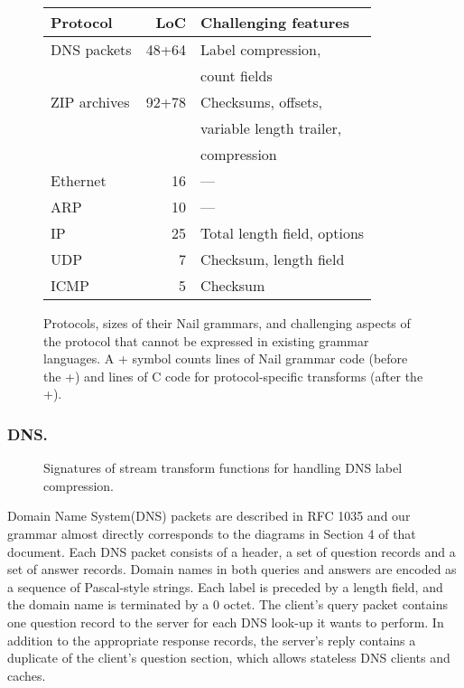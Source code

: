 \begin{figure}[tb]
\centering
\begin{tabular}{lrl}
\toprule
\textbf{Protocol} & \textbf{LoC} & \textbf{Challenging features} \\ 
\midrule
DNS packets & 48+64 & Label compression,\\
  & & count fields \\
ZIP archives & 92+78 & Checksums, offsets, \\ 
  & & variable length trailer, \\
  & & compression \\
Ethernet & 16 & --- \\
ARP & 10 & --- \\
IP & 25 & Total length field, options \\
UDP & 7 & Checksum, length field \\
ICMP & 5 & Checksum \\
\bottomrule
\end{tabular}

\caption{Protocols, sizes of their Nail grammars, and challenging aspects
of the protocol that cannot be expressed in existing grammar languages.
A + symbol counts lines of Nail grammar code (before the +) and lines of
C code for protocol-specific transforms (after the +).}
\label{fig:eval-protocols}
\end{figure}

\subsubsection{DNS.}



\begin{figure}
\smaller[0.5]

\caption{Signatures of stream transform functions for handling DNS label compression.}
\label{fig:dns-xform}
\end{figure}

Domain Name System(DNS) packets are described in RFC 1035 and our grammar almost directly
corresponds to the diagrams in Section 4 of that document. Each DNS packet consists of a header, a
set of question records and a set of answer records. Domain names in both queries and answers are
encoded as a sequence of Pascal-style strings. Each label is preceded by a length field, and the
domain name is terminated by a $0$ octet. The client's query packet contains one question
record to the server for each DNS look-up it wants to perform. In addition to the appropriate
response records, the server's reply contains a duplicate of the client's question section, which
allows stateless DNS clients and caches.

